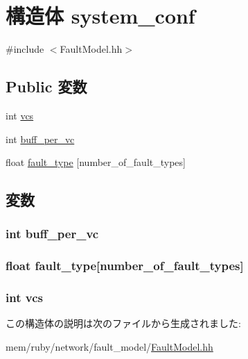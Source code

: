 \hypertarget{structFaultModel_1_1system__conf}{
\section{構造体 system\_\-conf}
\label{structFaultModel_1_1system__conf}
}


{\ttfamily \#include $<$FaultModel.hh$>$}\subsection*{Public 変数}
\begin{DoxyCompactItemize}
\item 
int \hyperlink{structFaultModel_1_1system__conf_aff3c11f5a43f1f0e5e0b7d037a202fb1}{vcs}
\item 
int \hyperlink{structFaultModel_1_1system__conf_a976f05a8fc5b5b5fd700b180b8d95d68}{buff\_\-per\_\-vc}
\item 
float \hyperlink{structFaultModel_1_1system__conf_aa8f5e04c807b5c28799f6070b26f6787}{fault\_\-type} \mbox{[}number\_\-of\_\-fault\_\-types\mbox{]}
\end{DoxyCompactItemize}


\subsection{変数}
\hypertarget{structFaultModel_1_1system__conf_a976f05a8fc5b5b5fd700b180b8d95d68}{
\subsubsection[{buff\_\-per\_\-vc}]{\setlength{\rightskip}{0pt plus 5cm}int {\bf buff\_\-per\_\-vc}}}
\label{structFaultModel_1_1system__conf_a976f05a8fc5b5b5fd700b180b8d95d68}
\hypertarget{structFaultModel_1_1system__conf_aa8f5e04c807b5c28799f6070b26f6787}{
\subsubsection[{fault\_\-type}]{\setlength{\rightskip}{0pt plus 5cm}float {\bf fault\_\-type}\mbox{[}number\_\-of\_\-fault\_\-types\mbox{]}}}
\label{structFaultModel_1_1system__conf_aa8f5e04c807b5c28799f6070b26f6787}
\hypertarget{structFaultModel_1_1system__conf_aff3c11f5a43f1f0e5e0b7d037a202fb1}{
\subsubsection[{vcs}]{\setlength{\rightskip}{0pt plus 5cm}int {\bf vcs}}}
\label{structFaultModel_1_1system__conf_aff3c11f5a43f1f0e5e0b7d037a202fb1}


この構造体の説明は次のファイルから生成されました:\begin{DoxyCompactItemize}
\item 
mem/ruby/network/fault\_\-model/\hyperlink{FaultModel_8hh}{FaultModel.hh}\end{DoxyCompactItemize}
